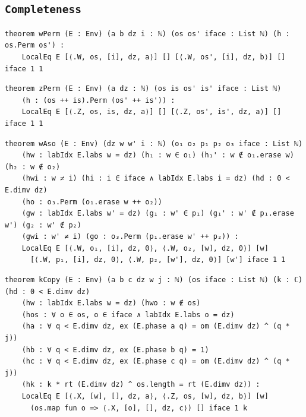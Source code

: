 \subsection{\texttt{Completeness}}
\begin{lstlisting}[style=leancore]
theorem wPerm (E : Env) (a b dz i : ℕ) (os os' iface : List ℕ) (h : os.Perm os') :
    LocalEq E [⟨.W, os, [i], dz, a⟩] [] [⟨.W, os', [i], dz, b⟩] [] iface 1 1
\end{lstlisting}
\begin{lstlisting}[style=leancore]
theorem zPerm (E : Env) (a dz : ℕ) (os is os' is' iface : List ℕ)
    (h : (os ++ is).Perm (os' ++ is')) :
    LocalEq E [⟨.Z, os, is, dz, a⟩] [] [⟨.Z, os', is', dz, a⟩] [] iface 1 1
\end{lstlisting}
\begin{lstlisting}[style=leancore]
theorem wAso (E : Env) (dz w w' i : ℕ) (o₁ o₂ p₁ p₂ o₃ iface : List ℕ)
    (hw : labIdx E.labs w = dz) (h₁ : w ∈ o₁) (h₁' : w ∉ o₁.erase w) (h₂ : w ∉ o₂)
    (hwi : w ≠ i) (hi : i ∈ iface ∧ labIdx E.labs i = dz) (hd : 0 < E.dimv dz)
    (ho : o₃.Perm (o₁.erase w ++ o₂))
    (gw : labIdx E.labs w' = dz) (g₁ : w' ∈ p₁) (g₁' : w' ∉ p₁.erase w') (g₂ : w' ∉ p₂)
    (gwi : w' ≠ i) (go : o₃.Perm (p₁.erase w' ++ p₂)) :
    LocalEq E [⟨.W, o₁, [i], dz, 0⟩, ⟨.W, o₂, [w], dz, 0⟩] [w]
      [⟨.W, p₁, [i], dz, 0⟩, ⟨.W, p₂, [w'], dz, 0⟩] [w'] iface 1 1
\end{lstlisting}
\begin{lstlisting}[style=leancore]
theorem kCopy (E : Env) (a b c dz w j : ℕ) (os iface : List ℕ) (k : ℂ) (hd : 0 < E.dimv dz)
    (hw : labIdx E.labs w = dz) (hwo : w ∉ os)
    (hos : ∀ o ∈ os, o ∈ iface ∧ labIdx E.labs o = dz)
    (ha : ∀ q < E.dimv dz, ex (E.phase a q) = om (E.dimv dz) ^ (q * j))
    (hb : ∀ q < E.dimv dz, ex (E.phase b q) = 1)
    (hc : ∀ q < E.dimv dz, ex (E.phase c q) = om (E.dimv dz) ^ (q * j))
    (hk : k * rt (E.dimv dz) ^ os.length = rt (E.dimv dz)) :
    LocalEq E [⟨.X, [w], [], dz, a⟩, ⟨.Z, os, [w], dz, b⟩] [w]
      (os.map fun o => ⟨.X, [o], [], dz, c⟩) [] iface 1 k
\end{lstlisting}


